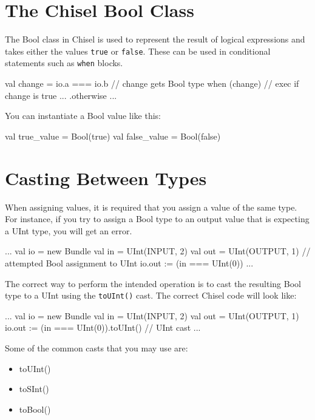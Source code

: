 \section{The Chisel Bool Class}

The Bool class in Chisel is used to represent the result of logical expressions and takes either the values \verb+true+ or \verb+false+. These can be used in conditional statements such as \verb+when+ blocks.

\begin{scala}
val change = io.a === io.b // change gets Bool type
when (change) {            // exec if change is true
  ...
} .otherwise {
  ...
}
\end{scala}

You can instantiate a Bool value like this:

\begin{scala}
val true_value  = Bool(true)
val false_value = Bool(false)
\end{scala}


\section{Casting Between Types}

When assigning values, it is required that you assign a value of the same type. For instance, if you try to assign a Bool type to an output value that is expecting a UInt type, you will get an error.

\begin{scala}
  ...
  val io  = new Bundle {
    val in  = UInt(INPUT, 2)
    val out = UInt(OUTPUT, 1)
  }
  // attempted Bool assignment to UInt
  io.out := (in === UInt(0)) 
  ...
\end{scala}

The correct way to perform the intended operation is to cast the resulting Bool type to a UInt using the \verb+toUInt()+ cast. The correct Chisel code will look like:

\begin{scala}
  ...
  val io = new Bundle {
    val in  = UInt(INPUT, 2)
    val out = UInt(OUTPUT, 1)
  }
  io.out := (in === UInt(0)).toUInt() // UInt cast
  ...
\end{scala}

Some of the common casts that you may use are:

\begin{itemize}
\item toUInt()
\item toSInt()
\item toBool()
\end{itemize}
